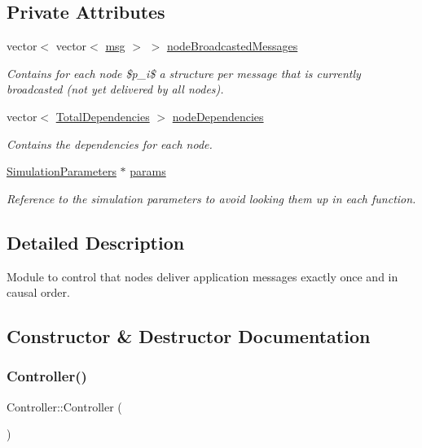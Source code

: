 \subsection*{Private Attributes}
\begin{DoxyCompactItemize}
\item 
vector$<$ vector$<$ \hyperlink{_controller_8h_afa0f3b802fbc219228f7bb97996fa558}{msg} $>$ $>$ \hyperlink{class_controller_a4016e696420b0a6b14308b117070b506}{node\+Broadcasted\+Messages}
\begin{DoxyCompactList}\small\item\em Contains for each node \$p\+\_\+i\$ a structure per message that is currently broadcasted (not yet delivered by all nodes). \end{DoxyCompactList}\item 
vector$<$ \hyperlink{class_total_dependencies}{Total\+Dependencies} $>$ \hyperlink{class_controller_ade3eeb8e78c5307d518e3b43967c4bac}{node\+Dependencies}
\begin{DoxyCompactList}\small\item\em Contains the dependencies for each node. \end{DoxyCompactList}\item 
\hyperlink{class_simulation_parameters}{Simulation\+Parameters} $\ast$ \hyperlink{class_controller_a81d7fe43b78ef7601e6b36c3df38ce79}{params}
\begin{DoxyCompactList}\small\item\em Reference to the simulation parameters to avoid looking them up in each function. \end{DoxyCompactList}\end{DoxyCompactItemize}


\subsection{Detailed Description}
Module to control that nodes deliver application messages exactly once and in causal order. 

\subsection{Constructor \& Destructor Documentation}
\mbox{\label{class_controller_a95c56822d667e94b031451729ce069a9}} 
\subsubsection{\texorpdfstring{Controller()}{Controller()}}
{\footnotesize\ttfamily Controller\+::\+Controller (\begin{DoxyParamCaption}{ }\end{DoxyParamCaption})}

